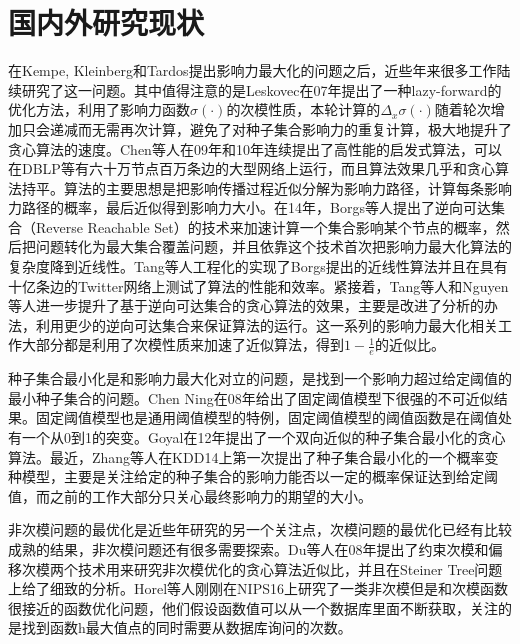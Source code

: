 \section{国内外研究现状}
在Kempe, Kleinberg和Tardos\cite{Kempe2003maximizing}提出影响力最大化的问题之后，近些年来很多工作陆续研究了这一问题\cite{bharathi2007competitive,Leskovec2007celf,Chen2009efficient,chen2010sharpphard,Goyal2011simpath}。其中值得注意的是Leskovec\cite{Leskovec2007celf}在07年提出了一种lazy-forward的优化方法，利用了影响力函数$\sigma(\cdot)$的次模性质，本轮计算的$\Delta_x\sigma(\cdot)$随着轮次增加只会递减而无需再次计算，避免了对种子集合影响力的重复计算，极大地提升了贪心算法的速度。Chen等人在09年\cite{Chen2009efficient}和10年\cite{chen2010sharpphard}连续提出了高性能的启发式算法，可以在DBLP等有六十万节点百万条边的大型网络上运行，而且算法效果几乎和贪心算法持平。算法的主要思想是把影响传播过程近似分解为影响力路径，计算每条影响力路径的概率，最后近似得到影响力大小。在14年，Borgs等人\cite{borgs2014rrset}提出了逆向可达集合（Reverse Reachable Set）的技术来加速计算一个集合影响某个节点的概率，然后把问题转化为最大集合覆盖问题，并且依靠这个技术首次把影响力最大化算法的复杂度降到近线性。Tang等人\cite{tang2014newrrset}工程化的实现了Borgs提出的近线性算法并且在具有十亿条边的Twitter网络上测试了算法的性能和效率。紧接着，Tang等人\cite{tang2015influence}和Nguyen等人\cite{mtai2016sigmod}进一步提升了基于逆向可达集合的贪心算法的效果，主要是改进了分析的办法，利用更少的逆向可达集合来保证算法的运行。这一系列的影响力最大化相关工作大部分都是利用了次模性质来加速了近似算法，得到$1-\frac{1}{e}$的近似比。

种子集合最小化是和影响力最大化对立的问题，是找到一个影响力超过给定阈值的最小种子集合的问题。Chen Ning在08年\cite{Chen2008approximability}给出了固定阈值模型下很强的不可近似结果。固定阈值模型也是通用阈值模型的特例，固定阈值模型的阈值函数是在阈值处有一个从0到1的突变。Goyal在12年\cite{goyal2012minimizing}提出了一个双向近似的种子集合最小化的贪心算法。最近，Zhang等人\cite{zhang2014prob}在KDD14上第一次提出了种子集合最小化的一个概率变种模型，主要是关注给定的种子集合的影响力能否以一定的概率保证达到给定阈值，而之前的工作大部分只关心最终影响力的期望的大小。


非次模问题的最优化是近些年研究的另一个关注点，次模问题的最优化已经有比较成熟的结果，非次模问题还有很多需要探索。Du等人\cite{du2008analysis}在08年提出了约束次模和偏移次模两个技术用来研究非次模优化的贪心算法近似比，并且在Steiner Tree问题上给了细致的分析。Horel等人\cite{Horel2016sub}刚刚在NIPS16上研究了一类非次模但是和次模函数很接近的函数优化问题，他们假设函数值可以从一个数据库里面不断获取，关注的是找到函数h最大值点的同时需要从数据库询问的次数。

